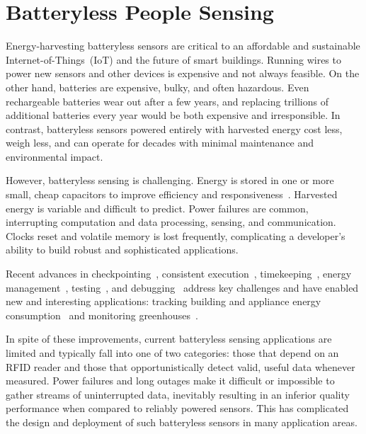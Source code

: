 \section{Batteryless People Sensing}
\label{sec:background}

Energy-harvesting batteryless sensors are critical to an affordable and sustainable Internet-of-Things~(IoT) and the future of smart buildings.
%
Running wires to power new sensors and other devices is expensive and not always feasible.
On the other hand, batteries are expensive, bulky, and often hazardous.
Even rechargeable batteries wear out after a few years, and replacing trillions of additional batteries every year would be both expensive and irresponsible.
%
In contrast, batteryless sensors powered entirely with harvested energy cost less, weigh less, and can operate for decades with minimal maintenance and environmental impact.

However, batteryless sensing is challenging.
Energy is stored in one or more small, cheap capacitors to improve efficiency and responsiveness~\cite{jhester:ufop:sensys}.
Harvested energy is variable and difficult to predict.
Power failures are common, interrupting computation and data processing, sensing, and communication.
Clocks reset and volatile memory is lost frequently, complicating a developer's ability to build robust and sophisticated applications.

Recent advances in checkpointing~\cite{ransford2011mementos, balsamo2015hibernus}, consistent execution~\cite{colin2016chain, Lucia:2015:Dino}, timekeeping~\cite{hester2016persistent}, energy management~\cite{jhester:ufop:sensys}, testing~\cite{ekho-sensys}, and debugging~\cite{colin_edb} address key challenges and have enabled new and interesting applications:  tracking building and appliance energy consumption~\cite{debruin2013monjolo,campbell2014energy} and monitoring greenhouses~\cite{jhester:ufop:sensys}.


In spite of these improvements, current batteryless sensing applications are limited and typically fall into one of two categories: those that depend on an RFID reader and those that opportunistically detect valid, useful data whenever measured.
Power failures and long outages make it difficult or impossible to gather streams of uninterrupted data, inevitably resulting in an inferior quality performance when compared to reliably powered sensors.
This has complicated the design and deployment of such batteryless sensors in many application areas.

